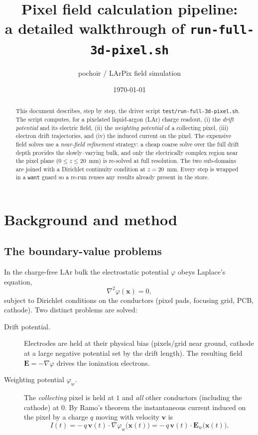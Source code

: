 \documentclass[11pt]{article}
\title{Pixel field calculation pipeline:\\
       a detailed walkthrough of \texttt{run-full-3d-pixel.sh}}
\author{pochoir / LArPix field simulation}
\date{\today}
\begin{document}
\maketitle

\begin{abstract}
This document describes, step by step, the driver script
\texttt{test/run-full-3d-pixel.sh}.  The script computes, for a pixelated
liquid-argon (LAr) charge readout, (i) the \emph{drift potential} and its
electric field, (ii) the \emph{weighting potential} of a collecting pixel,
(iii) electron drift trajectories, and (iv) the induced current on the
pixel.  The expensive field solves use a \emph{near-field refinement}
strategy: a cheap coarse solve over the full drift depth provides the
slowly--varying bulk, and only the electrically complex region near the
pixel plane ($0\le z\le 20$~mm) is re-solved at full resolution.  The two
sub-domains are joined with a Dirichlet continuity condition at
$z=20$~mm.  Every step is wrapped in a \texttt{want} guard so a re-run
reuses any results already present in the store.
\end{abstract}

\tableofcontents

\section{Background and method}

\subsection{The boundary-value problems}

In the charge-free LAr bulk the electrostatic potential $\varphi$ obeys
Laplace's equation,
\begin{equation}
  \nabla^2 \varphi(\mathbf{x}) = 0 ,
  \label{eq:laplace}
\end{equation}
subject to Dirichlet conditions on the conductors (pixel pads, focusing
grid, PCB, cathode).  Two distinct problems are solved:

\begin{description}
\item[Drift potential.] Electrodes are held at their physical bias
  (pixels/grid near ground, cathode at a large negative potential set by
  the drift length).  The resulting field $\mathbf{E}=-\nabla\varphi$
  drives the ionization electrons.
\item[Weighting potential $\varphi_w$.] The \emph{collecting} pixel is
  held at $1$ and \emph{all} other conductors (including the cathode) at
  $0$.  By Ramo's theorem the instantaneous current induced on the pixel
  by a charge $q$ moving with velocity $\mathbf{v}$ is
  \begin{equation}
    I(t) = -\,q\,\mathbf{v}(t)\cdot\nabla\varphi_w\big(\mathbf{x}(t)\big)
         = -\,q\,\mathbf{v}(t)\cdot\mathbf{E}_w\big(\mathbf{x}(t)\big).
    \label{eq:ramo}
  \end{equation}
\end{description}
\end{document}
